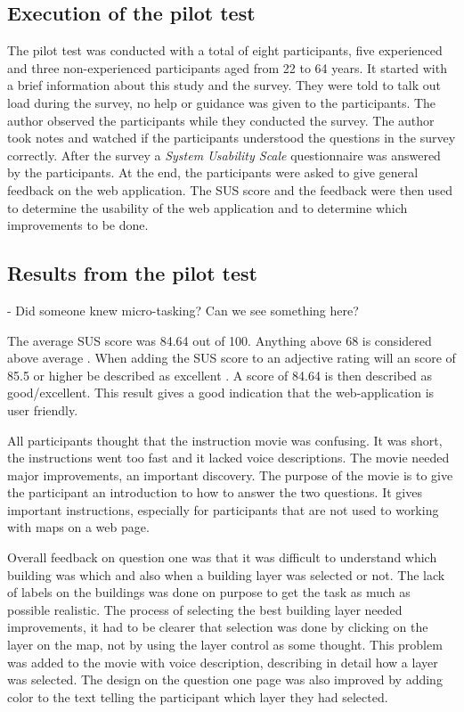 \subsection{Execution of the pilot test}
The pilot test was conducted with a total of eight participants, five experienced and three non-experienced participants aged from 22 to 64 years. It started with a brief information about this study and the survey. They were told to talk out load during the survey, no help or guidance was given to the participants. The author observed the participants while they conducted the survey. The author took notes and watched if the participants understood the questions in the survey correctly. After the survey a \textit{System Usability Scale} questionnaire was answered by the participants. At the end, the participants were asked to give general feedback on the web application. The SUS score and the feedback were then used to determine the usability of the web application and to determine which improvements to be done.  

\subsection{Results from the pilot test}

- Did someone knew micro-tasking? Can we see something here?

The average SUS score was 84.64 out of 100. Anything above 68 is considered above average \citep{Affairs2013}. When adding the SUS score to an adjective rating will an score of 85.5 or higher be described as excellent \citep{Bangor2009}. A score of 84.64 is then described as good/excellent. This result gives a good indication that the web-application is user friendly. 

All participants thought that the instruction movie was confusing. It was short, the instructions went too fast and it lacked voice descriptions. The movie needed major improvements, an important discovery. The purpose of the movie is to give the participant an introduction to how to answer the two questions. It gives important instructions, especially for participants that are not used to working with maps on a web page. 

Overall feedback on question one was that it was difficult to understand which building was which and also when a building layer was selected or not. The lack of labels on the buildings was done on purpose to get the task as much as possible realistic. The process of selecting the best building layer needed improvements, it had to be clearer that selection was done by clicking on the layer on the map, not by using the layer control as some thought. This problem was added to the movie with voice description, describing in detail how a layer was selected. The design on the question one page was also improved by adding color to the text telling the participant which layer they had selected. 

